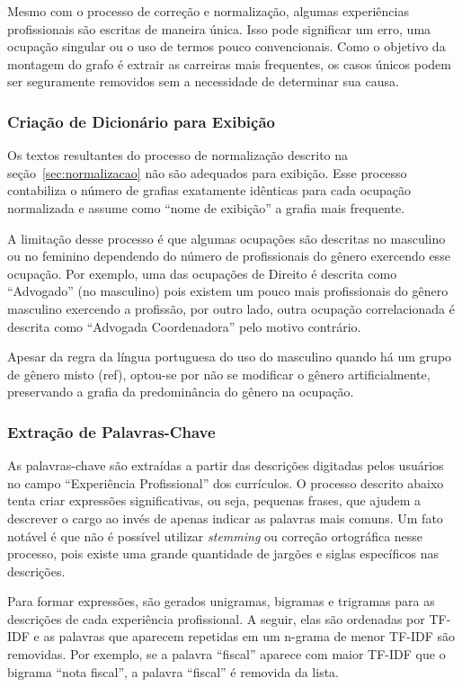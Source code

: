 \documentclass[12pt,a4paper]{article}
\theoremstyle{hypo}
\begin{document}
Mesmo com o processo de correção e normalização, algumas experiências profissionais são escritas de maneira única. Isso pode significar um erro, uma ocupação singular ou o uso de termos pouco convencionais. Como o objetivo da montagem do grafo é extrair as carreiras mais frequentes, os casos únicos podem ser seguramente removidos sem a necessidade de determinar sua causa.

\subsubsection{Criação de Dicionário para Exibição} \label{sec:criar-dicionario}

Os textos resultantes do processo de normalização descrito na seção~\ref{sec:normalizacao} não são adequados para exibição. Esse processo contabiliza o número de grafias exatamente idênticas para cada ocupação normalizada e assume como \enquote{nome de exibição} a grafia mais frequente.

A limitação desse processo é que algumas ocupações são descritas no masculino ou no feminino dependendo do número de profissionais do gênero exercendo esse ocupação. Por exemplo, uma das ocupações de Direito é descrita como \enquote{Advogado} (no masculino) pois existem um pouco mais profissionais do gênero masculino exercendo a profissão, por outro lado, outra ocupação correlacionada é descrita como \enquote{Advogada Coordenadora} pelo motivo contrário.

Apesar da regra da língua portuguesa do uso do masculino quando há um grupo de gênero misto (ref), optou-se por não se modificar o gênero artificialmente, preservando a grafia da predominância do gênero na ocupação.

\subsubsection{Extração de Palavras-Chave}

As palavras-chave são extraídas a partir das descrições digitadas pelos usuários no campo \enquote{Experiência Profissional} dos currículos. O processo descrito abaixo tenta criar expressões significativas, ou seja, pequenas frases, que ajudem a descrever o cargo ao invés de apenas indicar as palavras mais comuns. Um fato notável é que não é possível utilizar \textit{stemming} ou correção ortográfica nesse processo, pois existe uma grande quantidade de jargões e siglas específicos nas descrições.

Para formar expressões, são gerados unigramas, bigramas e trigramas para as descrições de cada experiência profissional. A seguir, elas são ordenadas por TF-IDF e as palavras que aparecem repetidas em um n-grama de menor TF-IDF são removidas. Por exemplo, se a palavra \enquote{fiscal} aparece com maior TF-IDF que o bigrama \enquote{nota fiscal}, a palavra \enquote{fiscal} é removida da lista.
\end{document}

